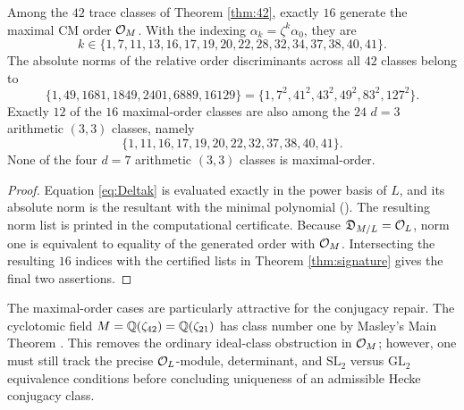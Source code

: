 \begin{theorem}\label{thm:maxorder}
Among the $42$ trace classes of Theorem \ref{thm:42}, exactly $16$ generate the maximal CM order $\mathcal O_M$. With the indexing $\alpha_k=\zeta^k\alpha_0$, they are
\[
 k\in\{1,7,11,13,16,17,19,20,22,28,32,34,37,38,40,41\}.
\]
The absolute norms of the relative order discriminants across all $42$ classes belong to
\[
 \{1,49,1681,1849,2401,6889,16129\}
 =\{1,7^2,41^2,43^2,49^2,83^2,127^2\}.
\]
Exactly $12$ of the $16$ maximal-order classes are also among the $24$ $d=3$ arithmetic $(3,3)$ classes, namely
\[
 \{1,11,16,17,19,20,22,32,37,38,40,41\}.
\]
None of the four $d=7$ arithmetic $(3,3)$ classes is maximal-order.
\end{theorem}
\begin{proof}
Equation \eqref{eq:Deltak} is evaluated exactly in the power basis of $L$, and its absolute norm is the resultant with the minimal polynomial (). The resulting norm list is printed in the computational certificate. Because $\mathfrak D_{M/L}=\mathcal O_L$, norm one is equivalent to equality of the generated order with $\mathcal O_M$. Intersecting the resulting $16$ indices with the certified lists in Theorem \ref{thm:signature} gives the final two assertions.
\end{proof}

\begin{remark}
The maximal-order cases are particularly attractive for the conjugacy repair. The cyclotomic field $M=\mathbb Q(\zeta_{42})=\mathbb Q(\zeta_{21})$ has class number one by Masley's Main Theorem \cite[p.~179]{Masley1976}. This removes the ordinary ideal-class obstruction in $\mathcal O_M$; however, one must still track the precise $\mathcal O_L$-module, determinant, and $\mathrm{SL}_2$ versus $\mathrm{GL}_2$ equivalence conditions before concluding uniqueness of an admissible Hecke conjugacy class.
\end{remark}

